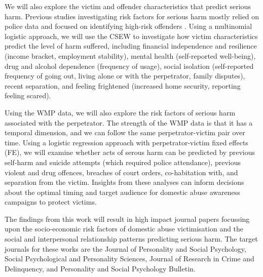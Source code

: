 \documentclass[11pt, a4paper]{article}
\newcommand{\TM}[1] {{\textcolor{orange}{#1}}}
\newcommand{\AT}[1] {{\textcolor{blue}{#1}}}
\begin{document}
 We will also explore the victim and offender characteristics that predict serious harm. Previous studies investigating risk factors for serious harm mostly relied on police data and focused on identifying high-risk offenders \cite{thornton}. Using a multinomial logistic approach, we will use the CSEW to investigate how victim characteristics predict the level of harm suffered, including financial independence and resilience (income bracket, employment stability), mental health (self-reported well-being), drug and alcohol dependence (frequency of usage), social isolation (self-reported frequency of going out, living alone or with the perpetrator, family disputes), recent separation, and feeling frightened (increased home security, reporting feeling scared).
 
 Using the WMP data, we will also explore the risk factors of serious harm associated with the perpetrator. The strength of the WMP data is that it has a temporal dimension, and we can follow the same perpetrator-victim pair over time. Using a logistic regression approach with perpetrator-victim fixed effects (FE), we will examine whether acts of serous harm can be predicted by previous self-harm and suicide attempts (which required police attendance), previous violent and drug offences, breaches of court orders, co-habitation with, and separation from the victim. Insights from these analyses can inform decisions about the optimal timing and target audience for domestic abuse awareness campaigns to protect victims. 
 
 The findings from this work will result in high impact journal papers focussing upon the socio-economic risk factors of domestic abuse victimisation and the social and interpersonal relationship patterns predicting serious harm. The target journals for these works are the Journal of Personality and Social Psychology, Social Psychological and Personality Sciences, Journal of Research in Crime and Delinquency, and Personality and Social Psychology Bulletin.
 
 


%
%
\end{document}
